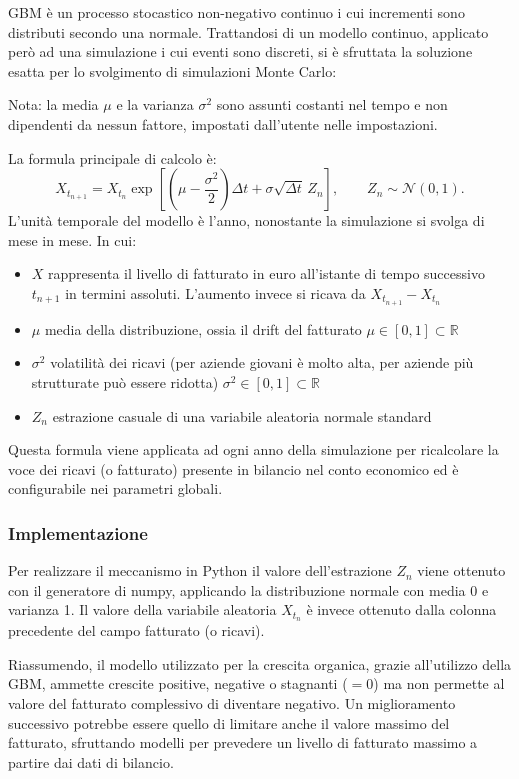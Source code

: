\documentclass{article}
\begin{document}
GBM è un processo stocastico non-negativo continuo i cui incrementi sono distributi secondo una normale. 
Trattandosi di un modello continuo, applicato però ad una simulazione i cui eventi sono discreti, si è sfruttata la soluzione esatta per lo svolgimento di simulazioni Monte Carlo:

Nota: la media $\mu$ e la varianza $\sigma^2$ sono assunti costanti nel tempo e non dipendenti da nessun fattore, impostati dall'utente nelle impostazioni. 

La formula principale di calcolo è:
\begin{equation}
X_{t_{n+1}} = X_{t_n}
\exp\left[
\left(\mu-\frac{\sigma^2}{2}\right)\Delta t
+\sigma\sqrt{\Delta t}\,Z_n
\right],
\qquad Z_n\sim\mathcal{N}(0,1).
\end{equation}
L'unità temporale del modello è l'anno, nonostante la simulazione si svolga di mese in mese. 
In cui:
\begin{itemize}
    \item $X$ rappresenta il livello di fatturato in euro all'istante di tempo successivo $t_{n+1}$ in termini assoluti. L'aumento invece si ricava da $X_{t_{n+1}} - X_{t_n}$
    \item $\mu$ media della distribuzione, ossia il drift del fatturato $\mu \in [0,1] \subset \mathbb{R}$
    \item $\sigma^2$ volatilità dei ricavi (per aziende giovani è molto alta, per aziende più strutturate può essere ridotta) $\sigma^2 \in [0,1] \subset \mathbb{R}$
    \item $Z_n$ estrazione casuale di una variabile aleatoria normale standard
\end{itemize}
Questa formula viene applicata ad ogni anno della simulazione per ricalcolare la voce dei ricavi (o fatturato) presente in bilancio nel conto economico ed è configurabile nei parametri globali. 
\subsubsection{Implementazione}
Per realizzare il meccanismo in Python il valore dell'estrazione $Z_n$ viene ottenuto con il generatore di numpy, applicando la distribuzione normale con media 0 e varianza 1.
Il valore della variabile aleatoria $X_{t_{n}}$ è invece ottenuto dalla colonna precedente del campo fatturato (o ricavi). 


Riassumendo, il modello utilizzato per la crescita organica, grazie all'utilizzo della GBM, ammette crescite positive, negative o stagnanti ($= 0$) ma non permette al valore del fatturato complessivo di diventare negativo. 
Un miglioramento successivo potrebbe essere quello di limitare anche il valore massimo del fatturato, sfruttando modelli per prevedere un livello di fatturato massimo a partire dai dati di bilancio. 
\end{document}
